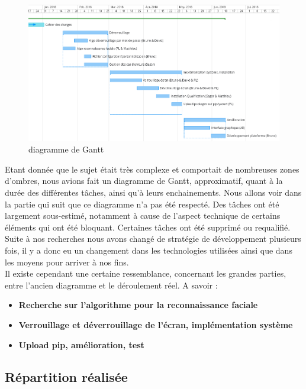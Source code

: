 \documentclass[french]{report}
\begin{document}
\begin{figure}[h]\label{fig:gantt}
  \includegraphics[width=\linewidth]{Gantt}
  \caption{diagramme de Gantt}
  \label{fig:gantt}
\end{figure}

Etant donnée que le sujet était très complexe et comportait de nombreuses zones
d'ombres, nous avions fait un diagramme de Gantt, approximatif, quant à la durée
des différentes tâches, ainsi qu'à leurs enchainements. Nous allons voir dans
la partie qui suit que ce diagramme n'a pas été respecté. Des tâches ont été
largement sous-estimé, notamment à cause de l'aspect technique de certains
éléments qui ont été bloquant. Certaines tâches ont été supprimé ou requalifié.
Suite à nos recherches nous avons changé de stratégie de développement plusieurs
fois, il y a donc eu un changement dans les technologies utilisées ainsi que dans les
moyens pour arriver à nos fins.
\\
Il existe cependant une certaine ressemblance, concernant les grandes parties,
entre l'ancien diagramme et le déroulement réel. A savoir :

\vspace{0.5cm}
\begin{itemize}[label=\textbullet, font=\normalfont \color{blue}]
  \item{\textbf{Recherche sur l'algorithme pour la reconnaissance faciale}}
  \item{\textbf{Verrouillage et déverrouillage de l'écran, implémentation système}}
  \item{\textbf{Upload pip, amélioration, test}}
\end{itemize}
\vspace{0.5cm}

\subsection{Répartition réalisée}
\end{document}
